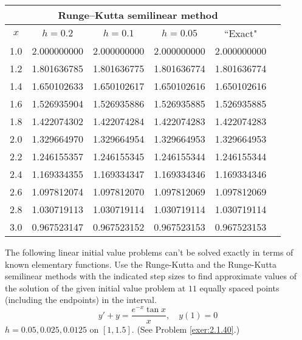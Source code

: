 \documentclass{ximera}
\begin{document}
\begin{problem}
\begin{solution}
{\small
\begin{tabular}{|c|r|r|r|r|r|}
\hline
\multicolumn{5}{|c|}{Runge--Kutta semilinear method}\\\hline
\multicolumn{1}{|c|}{$x$}&
\multicolumn{1}{|c|}{$h=0.2$}&
\multicolumn{1}{|c|}{$h=0.1$}&
\multicolumn{1}{|c|}{$h=0.05$}&
\multicolumn{1}{|c|}{``Exact"}\\ \hline
1.0 & 2.000000000 & 2.000000000 & 2.000000000 & 2.000000000 \\
1.2 & 1.801636785 & 1.801636775 & 1.801636774 & 1.801636774 \\
1.4 & 1.650102633 & 1.650102617 & 1.650102616 & 1.650102616 \\
1.6 & 1.526935904 & 1.526935886 & 1.526935885 & 1.526935885 \\
1.8 & 1.422074302 & 1.422074284 & 1.422074283 & 1.422074283 \\
2.0 & 1.329664970 & 1.329664954 & 1.329664953 & 1.329664953 \\
2.2 & 1.246155357 & 1.246155345 & 1.246155344 & 1.246155344 \\
2.4 & 1.169334355 & 1.169334347 & 1.169334346 & 1.169334346 \\
2.6 & 1.097812074 & 1.097812070 & 1.097812069 & 1.097812069 \\
2.8 & 1.030719113 & 1.030719114 & 1.030719114 & 1.030719114 \\
3.0 & 0.967523147 & 0.967523152 & 0.967523153 & 0.967523153 \\
\hline
\end{tabular}}
\end{solution}

\end{problem}

\begin{problem}\label{exer:3.3.17} The following linear initial value problems can't be solved exactly in terms of known elementary functions. Use the Runge-Kutta and the Runge-Kutta semilinear methods with the
indicated step sizes to find approximate values of the solution of the given initial value problem at $11$ equally spaced points (including the endpoints) in the interval.
$$y'+y=\frac{e^{-x}\tan x}{x},\quad y(1)=0$$
$h=0.05,0.025,0.0125$ on $[1,1.5]$.
(See Problem \ref{exer:2.1.40}.)

\end{problem}
\end{document}

